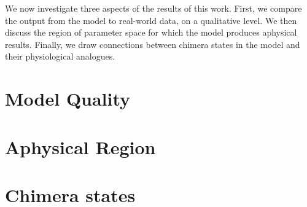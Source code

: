 We now investigate three aspects of the results of this work.
First, we compare the output from the model to real-world data, on a qualitative level.
We then discuss the region of parameter space for which the model produces aphysical results.
Finally, we draw connections between chimera states in the model and their physiological analogues.
\section{Model Quality}
\label{sec:results_model}


\section{Aphysical Region}
\label{sec:results_aphysical}


\section{Chimera states}
\label{sec:results_chimera}
